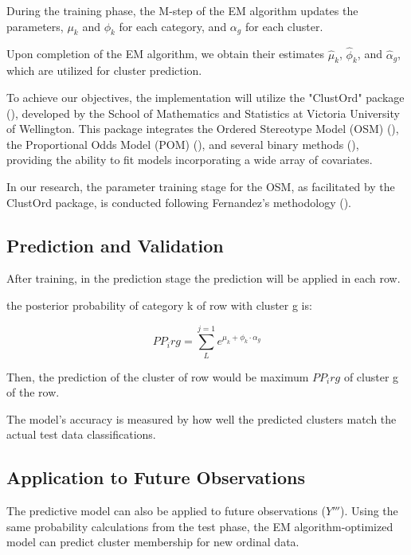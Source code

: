 \documentclass{article}
\begin{document}
During the training phase, the M-step of the EM algorithm updates the parameters, $\mu_k$ and $\phi_k$ for each category, and $\alpha_g$ for each cluster.

Upon completion of the EM algorithm, we obtain their estimates $\hat{\mu}_k$, $\hat{\phi}_k$, and $\hat{\alpha}_g$, which are utilized for cluster prediction.

To achieve our objectives, the implementation will utilize the "ClustOrd" package (\cite{clustord2024}), 
developed by the School of Mathematics and Statistics at Victoria University of Wellington. 
This package integrates the Ordered Stereotype Model (OSM) (\cite{fernandez2016mixture}), the Proportional Odds Model (POM) (\cite{matechou2016biclustering}), and several binary methods (\cite{pledger2014multivariate}), 
providing the ability to fit models incorporating a wide array of covariates.

In our research, the parameter training stage for the OSM, as facilitated by the ClustOrd package, is conducted following Fernandez's methodology (\cite{fernandez2016mixture}).

\subsection{Prediction and Validation}

After training, in the prediction stage the prediction will be applied in each row.

the posterior probability of category k of row with cluster g is:

\begin{equation}
PP_irg = \sum_{L}^{j=1} e^{\mu_k + \phi_k \cdot \alpha_g}
\end{equation}

Then, the prediction of the cluster of row would be maximum $PP_irg$ of cluster g of the row.

The model's accuracy is measured by how well the predicted clusters match the actual test data classifications.

\subsection{Application to Future Observations}

The predictive model can also be applied to future observations ($Y'''$). Using the same probability calculations from the test phase, the EM algorithm-optimized model can predict cluster membership for new ordinal data.
\end{document}
